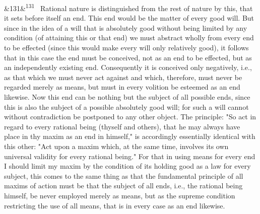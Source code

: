 \documentclass[12pt]{article}
\newcommand{\para}[1][]{\par\noindent\ifx&#1&\else\textsuperscript{\footnotesize #1}~\fi}
\begin{document}
\para[131] Rational nature is distinguished from the rest of nature by this, that it sets before itself an end. This end would be the matter of every good will. But since in the idea of a will that is absolutely good without being limited by any condition (of attaining this or that end) we must abstract wholly from every end to be effected (since this would make every will only relatively good), it follows that in this case the end must be conceived, not as an end to be effected, but as an independently existing end. Consequently it is conceived only negatively, i.e., as that which we must never act against and which, therefore, must never be regarded merely as means, but must in every volition be esteemed as an end likewise. Now this end can be nothing but the subject of all possible ends, since this is also the subject of a possible absolutely good will; for such a will cannot without contradiction be postponed to any other object. The principle: "So act in regard to every rational being (thyself and others), that he may always have place in thy maxim as an end in himself," is accordingly essentially identical with this other: "Act upon a maxim which, at the same time, involves its own universal validity for every rational being." For that in using means for every end I should limit my maxim by the condition of its holding good as a law for every subject, this comes to the same thing as that the fundamental principle of all maxims of action must be that the subject of all ends, i.e., the rational being himself, be never employed merely as means, but as the supreme condition restricting the use of all means, that is in every case as an end likewise.
\end{document}

